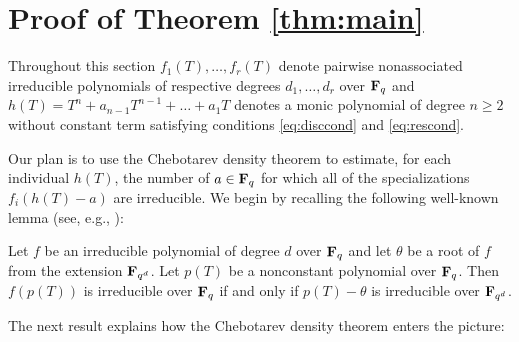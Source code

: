 \documentclass[a4paper]{compositio}
\begin{document}
\section{Proof of Theorem \ref{thm:main}}\label{sec:thm}

Throughout this section $f_1(T), \dots, f_r(T)$ denote pairwise
nonassociated irreducible polynomials of respective degrees $d_1,
\dots, d_r$ over $\mathbf{F}_q$ and $h(T) = T^n + a_{n-1}T^{n-1} + \dots +
a_1 T$ denotes a monic polynomial of degree $n \geq 2$ without
constant term satisfying conditions \eqref{eq:disccond} and
\eqref{eq:rescond}.

Our plan is to use the Chebotarev density theorem to estimate, for
each individual $h(T)$, the number of $a \in \mathbf{F}_q$ for which all of
the specializations $f_i(h(T)-a)$ are irreducible. We begin by
recalling the following well-known lemma (see, e.g., \cite[pp.
408-409]{cohen89}):

\begin{lem}\label{lem:subst} Let $f$ be an irreducible polynomial of degree $d$
over $\mathbf{F}_q$ and let $\theta$ be a root of $f$ from the extension
$\mathbf{F}_{q^d}$. Let $p(T)$ be a nonconstant polynomial over $\mathbf{F}_q$. Then
$f(p(T))$ is irreducible over $\mathbf{F}_q$ if and only if $p(T) - \theta$
is irreducible over $\mathbf{F}_{q^d}$.
\end{lem}

The next result explains how the Chebotarev density theorem enters
the picture:
\end{document}
